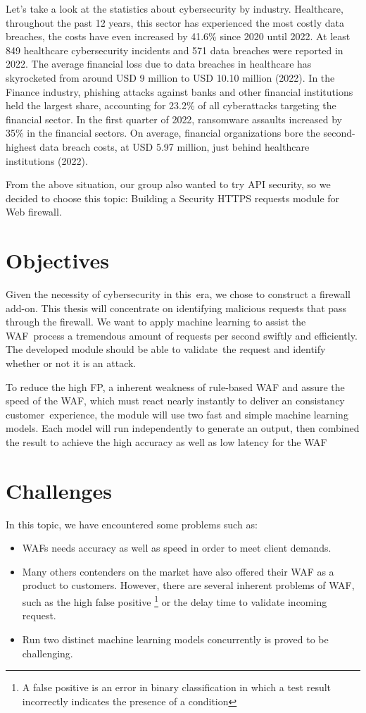 Let's take a look at the statistics about cybersecurity by industry. Healthcare, throughout the past 12 years, this sector has experienced the most costly data breaches, the costs have even increased by 41.6\% since 2020 until 2022. At least 849 healthcare cybersecurity incidents and 571 data breaches were reported in 2022. The average financial loss due to data breaches in healthcare has skyrocketed from around USD 9 million to USD 10.10 million (2022). In the Finance industry, phishing attacks against banks and other financial institutions held the largest share, accounting for 23.2\% of all cyberattacks targeting the financial sector. In the first quarter of 2022, ransomware assaults increased by 35\% in the financial sectors. On average, financial organizations bore the second-highest data breach costs, at USD 5.97 million, just behind healthcare institutions (2022). 

From the above situation, our group also wanted to try API security, so we decided to choose this topic: Building a Security HTTPS requests module for Web firewall.

\section{Objectives}
\label{sec:objectives}
Given the necessity of cybersecurity in this era, we chose to construct a firewall add-on. This thesis will concentrate on identifying malicious requests that pass through the firewall. We want to apply machine learning to assist the WAF process a tremendous amount of requests per second swiftly and efficiently. The developed module should be able to validate the request and identify whether or not it is an attack.

To reduce the high FP, a inherent weakness of rule-based WAF and assure the speed of the WAF, which must react nearly instantly to deliver an consistancy customer experience, the module will use two fast and simple machine learning models. Each model will run independently to generate an output, then combined the result to achieve the high accuracy as well as low latency for the WAF

\section{Challenges}
\label{sec:challenges}
In this topic, we have encountered some problems such as:
\begin{itemize}
    \item WAFs needs accuracy as well as speed in order to meet client demands.
    \item Many others contenders on the market have also offered their WAF as a product to customers. However, there are several inherent problems of WAF, such as the high false positive \footnote{A false positive is an error in binary classification in which a test result incorrectly indicates the presence of a condition} or the delay time to validate incoming request.
    \item Run two distinct machine learning models concurrently is proved to be challenging.
\end{itemize}
